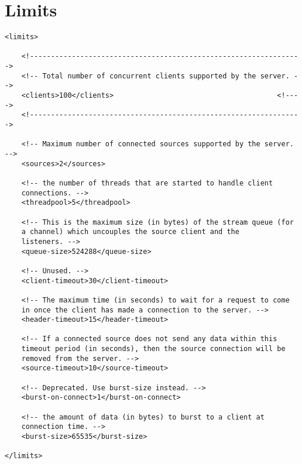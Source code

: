 


\section{Limits}


\begin{lstlisting}
<limits>

    <!----------------------------------------------------------------->
    <!-- Total number of concurrent clients supported by the server. -->
    <clients>100</clients>                                       <!---->
    <!----------------------------------------------------------------->

    <!-- Maximum number of connected sources supported by the server. -->
    <sources>2</sources>

    <!-- the number of threads that are started to handle client
    connections. -->
    <threadpool>5</threadpool>

    <!-- This is the maximum size (in bytes) of the stream queue (for
    a channel) which uncouples the source client and the
    listeners. -->
    <queue-size>524288</queue-size>

    <!-- Unused. -->
    <client-timeout>30</client-timeout>
    
    <!-- The maximum time (in seconds) to wait for a request to come
    in once the client has made a connection to the server. -->
    <header-timeout>15</header-timeout>

    <!-- If a connected source does not send any data within this
    timeout period (in seconds), then the source connection will be
    removed from the server. -->
    <source-timeout>10</source-timeout>

    <!-- Deprecated. Use burst-size instead. -->
    <burst-on-connect>1</burst-on-connect>

    <!-- the amount of data (in bytes) to burst to a client at
    connection time. -->
    <burst-size>65535</burst-size>

</limits>
\end{lstlisting}

